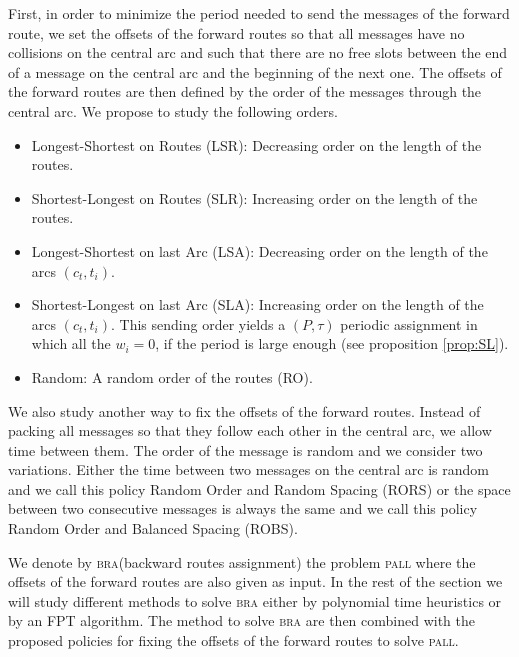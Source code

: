 \documentclass[10pt, conference, letterpaper]{IEEEtran}
\newcommand{\todo}[1]{{\color{red} TODO: {#1}}}
\newcommand\pall{\textsc{pall}\xspace}
\newcommand\bra{\textsc{bra}\xspace}
\begin{document}
     First, in order to minimize the period needed to send the messages of the forward route, we set the offsets of the forward routes so that all messages have no collisions on the central arc and such that there are no free slots between the end of a message on the central arc and the beginning of the next one.
     The offsets of the forward routes are then defined by the order of the messages through the central arc. We propose to study the following orders. 
	\begin{itemize}
	 
	 \item Longest-Shortest on Routes (LSR): Decreasing order on the length of the routes.
	 \item Shortest-Longest on Routes (SLR): Increasing order on the length of the routes. 
	 \item Longest-Shortest on last Arc (LSA): Decreasing order on the length of the arcs $(c_t,t_i)$.
	 \item Shortest-Longest on last Arc (SLA): Increasing order on the length of the arcs $(c_t,t_i)$. This sending order yields a $(P,\tau)$ periodic assignment in which all the $w_i = 0$, if the period is large enough (see proposition \ref{prop:SL}).
	 \item Random: A random order of the routes (RO).
	\end{itemize}

    We also study another way to fix the offsets of the forward routes. Instead of packing all messages so that they follow each other
    in the central arc, we allow time between them. The order of the message is random and we consider two variations. 
    Either the time between two messages on the central arc is random and we call this policy Random Order and Random Spacing (RORS) or the space between two consecutive messages is always the same and we call this policy Random Order and Balanced Spacing (ROBS).
 	
    We denote by \bra (backward routes assignment) the problem \pall where the offsets of the forward routes are also given as input.
    In the rest of the section we will study different methods to solve \bra either by polynomial time heuristics or by an FPT algorithm. The method to solve \bra are then combined with the proposed policies for fixing the offsets of the forward routes
    to solve \pall.  
   
\end{document}
